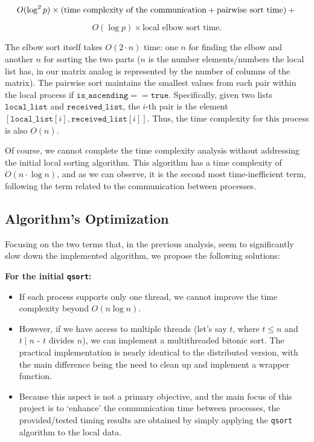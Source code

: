 \documentclass[12pt]{article}
\begin{document}
\[
O(\log^2 p) \times \left( \text{time complexity of the communication} + \text{pairwise sort time} \right) + \\ 
\]

\vspace{-20pt}

\[
O(\log p) \times \text{local elbow sort time}.
\]

The elbow sort itself takes \(O(2 \cdot n)\) time: one \(n\) for finding the elbow and another \(n\) for sorting the two parts ($n$ is the number elements/numbers the local list has, in our matrix analog is represented by the number of columns of the matrix). The pairwise sort maintains the smallest values from each pair within the local process if \(\texttt{is\_ascending} == \texttt{true}\). Specifically, given two lists \(\texttt{local\_list}\) and \(\texttt{received\_list}\), the \(i\)-th pair is the element \([\texttt{local\_list}[i], \texttt{received\_list}[i]]\). Thus, the time complexity for this process is also \(O(n)\).

Of course, we cannot complete the time complexity analysis without addressing the initial local sorting algorithm. This algorithm has a time complexity of \(O(n \cdot \log n)\), and as we can observe, it is the second most time-inefficient term, following the term related to the communication between processes.


\subsection{Algorithm's Optimization}
Focusing on the two terms that, in the previous analysis, seem to significantly slow down the implemented algorithm, we propose the following solutions:

\textbf{For the initial \texttt{qsort}:}

\vspace{-15pt}
\begin{itemize}[noitemsep]
    \item If each process supports only one thread, we cannot improve the time complexity beyond \(O(n \log n)\).
    \item However, if we have access to multiple threads (let's say \(t\), where \(t \leq n\) and \(t \mid n\) - $t$ divides $n$), we can implement a multithreaded bitonic sort. The practical implementation is nearly identical to the distributed version, with the main difference being the need to clean up and implement a wrapper function.
    \item Because this aspect is not a primary objective, and the main focus of this project is to `enhance' the communication time between processes, the provided/tested timing results are obtained by simply applying the \texttt{qsort} algorithm to the local data.
 
\end{itemize}
\end{document}
